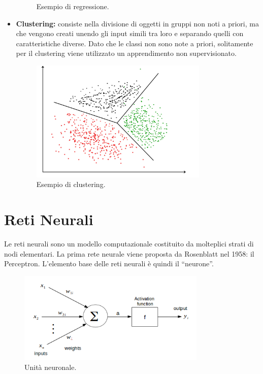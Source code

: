 \documentclass[12pt,a4paper,twoside,openright]{book}
\begin{document}
\begin{itemize}
\begin{figure}[H]
        \caption{Esempio di regressione.}
        \label{fig:rapp_file}
        \end{figure}
    \item \textbf{Clustering:} consiste nella divisione di oggetti in gruppi non noti a priori, ma che vengono creati unendo gli input simili tra loro e separando quelli con caratteristiche diverse. Dato che le classi non sono note a priori, solitamente per il clustering viene utilizzato un apprendimento non supervisionato.
        \begin{figure}[H]
        \centering
        \includegraphics[width=0.8\textwidth]{images/clustering.jpg}
        \caption{Esempio di clustering.}
        \label{fig:rapp_file}
        \end{figure}
\end{itemize}


\section{Reti Neurali}

Le reti neurali sono un modello computazionale costituito da molteplici strati di nodi elementari. La prima rete neurale viene proposta da Rosenblatt nel 1958: il Perceptron. 
L’elemento base delle reti neurali è quindi il “neurone”. 

\begin{figure}[H]
\centering
\includegraphics[width=0.8\textwidth]{images/neurone.png}
\caption{Unità neuronale.}
\label{fig:rapp_file}
\end{figure}
\end{document}
